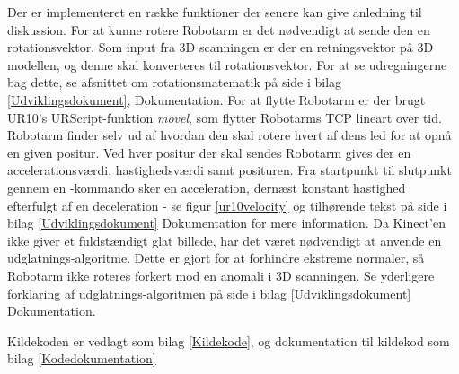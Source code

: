 Der er implementeret en række funktioner der senere kan give anledning til diskussion. 
For at kunne rotere Robotarm er det nødvendigt at sende den en rotationsvektor. Som input fra 3D scanningen er der en retningsvektor på 3D modellen, og denne skal konverteres til rotationsvektor. For at se udregningerne bag dette, se afsnittet om rotationsmatematik på side \pageref{rotationsmatematik} i bilag \ref{Udviklingsdokument}, Dokumentation.
\newline
For at flytte Robotarm er der brugt UR10's URScript-funktion \textit{movel}, som flytter Robotarms TCP lineart over tid. Robotarm finder selv ud af hvordan den skal rotere hvert af dens led for at opnå en given positur. Ved hver positur der skal sendes Robotarm gives der en accelerationsværdi, hastighedsværdi samt posituren. Fra startpunkt til slutpunkt gennem en -kommando sker en acceleration, dernæst konstant hastighed efterfulgt af en deceleration - se figur \ref{ur10velocity} og tilhørende tekst på side \pageref{ur10velocity} i bilag \ref{Udviklingsdokument} Dokumentation for mere information.
\newline
Da Kinect'en ikke giver et fuldstændigt glat billede, har det været nødvendigt at anvende en udglatnings-algoritme. Dette er gjort for at forhindre ekstreme normaler, så Robotarm ikke roteres forkert mod en anomali i 3D scanningen. Se yderligere forklaring af udglatnings-algoritmen på side \pageref{calculationlibraryafsnit} i bilag \ref{Udviklingsdokument} Dokumentation.

Kildekoden er vedlagt som bilag \ref{Kildekode}, og dokumentation til kildekod som bilag \ref{Kodedokumentation}
